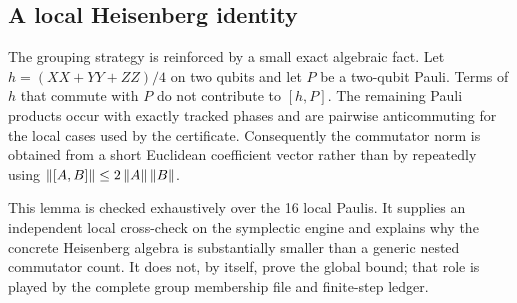 \subsection{A local Heisenberg identity}

The grouping strategy is reinforced by a small exact algebraic fact.  Let
$h=(XX+YY+ZZ)/4$ on two qubits and let $P$ be a two-qubit Pauli.  Terms of $h$
that commute with $P$ do not contribute to $[h,P]$.  The remaining Pauli
products occur with exactly tracked phases and are pairwise anticommuting for
the local cases used by the certificate.  Consequently the commutator norm is
obtained from a short Euclidean coefficient vector rather than by repeatedly
using $\left\lVert [A,B]\right\rVert\leq2\left\lVert A\right\rVert\left\lVert B\right\rVert$.

This lemma is checked exhaustively over the 16 local Paulis.  It supplies an
independent local cross-check on the symplectic engine and explains why the
concrete Heisenberg algebra is substantially smaller than a generic nested
commutator count.  It does not, by itself, prove the global bound; that role is
played by the complete group membership file and finite-step ledger.
